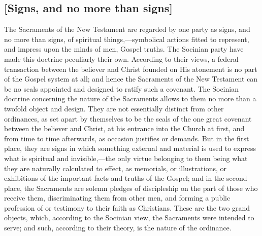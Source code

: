 \documentclass[
]{book}
\begin{document}
\hypertarget{signs-and-no-more-than-signs}{%
\subsection{{[}Signs, and no more than signs{]}}\label{signs-and-no-more-than-signs}}

The Sacraments of the New Testament are regarded by one party as signs, and no more than signs, of spiritual things,---symbolical actions fitted to represent, and impress upon the minds of men, Gospel truths. The Socinian party have made this doctrine peculiarly their own. According to their views, a federal transaction between the believer and Christ founded on His atonement is no part of the Gospel system at all; and hence the Sacraments of the New Testament can be no seals appointed and designed to ratify such a covenant. The Socinian doctrine concerning the nature of the Sacraments allows to them no more than a twofold object and design. They are not essentially distinct from other ordinances, as set apart by themselves to be the seals of the one great covenant between the believer and Christ, at his entrance into the Church at first, and from time to time afterwards, as occasion justifies or demands. But in the first place, they are signs in which something external and material is used to express what is spiritual and invisible,---the only virtue belonging to them being what they are naturally calculated to effect, as memorials, or illustrations, or exhibitions of the important facts and truths of the Gospel; and in the second place, the Sacraments are solemn pledges of discipleship on the part of those who receive them, discriminating them from other men, and forming a public profession of or testimony to their faith as Christians. These are the two grand objects, which, according to the Socinian view, the Sacraments were intended to serve; and such, according to their theory, is the nature of the ordinance.
\end{document}
